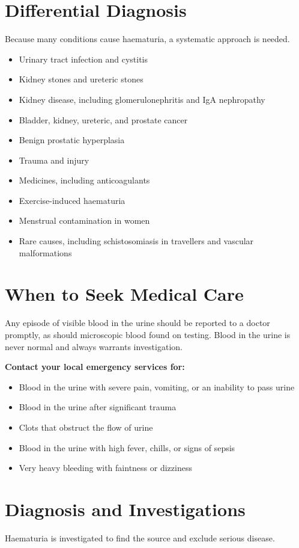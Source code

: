 \section*{Differential Diagnosis}
Because many conditions cause haematuria, a systematic approach is needed.

\begin{itemize}
    \item Urinary tract infection and cystitis
    \item Kidney stones and ureteric stones
    \item Kidney disease, including glomerulonephritis and IgA nephropathy
    \item Bladder, kidney, ureteric, and prostate cancer
    \item Benign prostatic hyperplasia
    \item Trauma and injury
    \item Medicines, including anticoagulants
    \item Exercise-induced haematuria
    \item Menstrual contamination in women
    \item Rare causes, including schistosomiasis in travellers and vascular malformations
\end{itemize}

\section*{When to Seek Medical Care}
Any episode of visible blood in the urine should be reported to a doctor promptly, as should microscopic blood found on testing. Blood in the urine is never normal and always warrants investigation.

\textbf{Contact your local emergency services for:}
\begin{itemize}
    \item Blood in the urine with severe pain, vomiting, or an inability to pass urine
    \item Blood in the urine after significant trauma
    \item Clots that obstruct the flow of urine
    \item Blood in the urine with high fever, chills, or signs of sepsis
    \item Very heavy bleeding with faintness or dizziness
\end{itemize}

\section*{Diagnosis and Investigations}
Haematuria is investigated to find the source and exclude serious disease.

